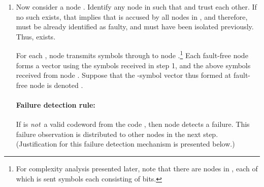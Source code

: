 \documentclass[12pt]{article}
\begin{document}
\begin{enumerate}
\begin{itemize}
and define

Let the -symbol received vector at node  consisting of the
symbols received from the  nodes in  be called .\footnote{In vector ,
the symbols are arranged in increasing order of the identifiers of the nodes that sent them.}

Since  contains  nodes and there are at most  faulty nodes, at least  of these nodes
must be fault-free.
Consider two fault-free nodes  and  in .
By definition of  and , nodes  and 
find these vectors ``consistent'' with their own values
 and , respectively. In other words,
 and  are codewords in .

There are at least   fault-free nodes in , which must
have sent the same symbols to nodes  and  in step 1.
Thus, the -symbol vectors  and  must be identical
in at least  positions, and differ in at most  positions.

Given that (i)  is a distance  code, (ii) 
and  are both codewords in , and (iii) 
and  differ in at most  positions, it follows that
 and  must be identical. This, in turn, implies that
 and  must be identical as well.
This proves the following claim:

~

{\bf Claim 1:} All fault-free nodes in  have identical -bit
values. In other words, for all fault-free nodes , 
.

\end{itemize}

\item \label{step_y} Now consider a node .
Identify any node  in  such that  and  trust each other.
If no such  exists, that implies that  is accused by all
 nodes in , and therefore,  must be already identified
as faulty, and must have
been isolated previously.
Thus,  exists.


For each ,
node  transmits  symbols  through  to node
.\footnote{For complexity analysis presented later, note that there are  nodes in ,
each of which is sent  symbols each consisting of  bits.}
Each fault-free node  
forms a vector using the  symbols 
received in step 1, and the above  symbols received from node .
Suppose that the -symbol vector thus formed at fault-free node  is
denoted .

\paragraph{Failure detection rule:}
If  is {\em not}\, a valid codeword from the  code , then
node  detects a failure. This failure observation is distributed
to other nodes in the next step. (Justification for this failure detection
mechanism is presented below.)


\end{enumerate}
\end{document}

